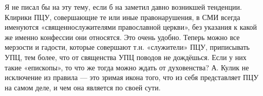 Я не писал бы на эту тему, если б на заметил давно возникшей тенденции. Клирики
ПЦУ, совершающие те или иные правонарушения, в СМИ всегда именуются
«священнослужителями православной церкви», без указания к какой же именно
конфессии они относятся. Это очень удобно. Теперь можно все мерзости и гадости,
которые совершают т.н. «служители» ПЦУ, приписывать УПЦ, тем более, что от
священства УПЦ поводов не дождёшься. Если у них такие «епископы», то что же
тогда можно ждать от духовенства? А. Кулик не исключение из правила — это
зримая икона того, что из себя представляет ПЦУ на самом деле, и чем она
является по своей сути.
